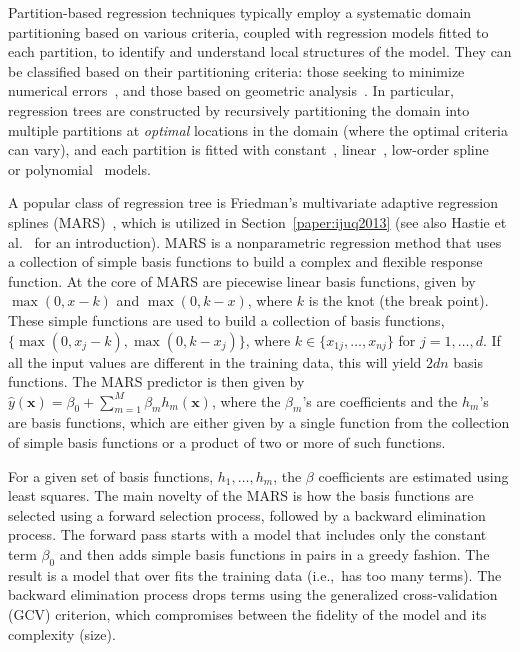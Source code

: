 Partition-based regression techniques typically employ a systematic domain partitioning based on various criteria, coupled with regression models fitted to each partition, to identify and understand local structures of the model.
%
They can be classified based on their partitioning criteria: those seeking to minimize numerical errors~\cite{Friedman1991,AlexanderGrimshaw1996,BreimanFriedmanOlshen1984a,ChaudhuriHuangLoh1994,ChipmanMcCulloch2010}, and those based on geometric analysis~\cite{GerberPotter2012,GerberRubelBremer2011,LiLueChen2000}.
%
In particular, regression trees are constructed by recursively partitioning the domain into multiple partitions at \emph{optimal} locations in the domain (where the optimal criteria can vary), and each partition is fitted with constant~\cite{BreimanFriedmanOlshen1984a}, linear~\cite{AlexanderGrimshaw1996,LiLueChen2000}, low-order spline~\cite{Friedman1991} or polynomial~\cite{ChaudhuriHuangLoh1994} models.

A popular class of regression tree is Friedman's multivariate adaptive regression splines (MARS)~\cite{Friedman1991}, which is utilized in Section~\ref{paper:ijuq2013} (see also Hastie et al.~\cite{HastieTibshiraniFriedman2008} for an introduction).
%
MARS is a nonparametric regression method that uses a collection of simple basis functions to build a complex and flexible response function.
%
At the core of MARS are piecewise linear basis functions, given by $\max(0, x - k)$ and $\max(0, k - x)$, where $k$ is the knot (the break point).
%
These simple functions are used to build a collection of basis functions, $\{\max(0, x_j-k), \max(0,k-x_j)\}$, where $k \in \{x_{1j}, \dots, x_{nj}\}$ for $j = 1, \dots, d$.
%
If all the input values are different in the training data, this will yield $2dn$ basis functions. The MARS predictor is then given by $\hat{y}(\mathbf{x}) = \beta_0 + \sum_{m=1}^M \beta_m h_m(\mathbf{x})$, where the $\beta_m$'s are coefficients and the $h_m$'s are basis functions, which are either given by a single function from the collection of simple basis functions or a product of
two or more of such functions.

For a given set of basis functions, $h_1, \dots, h_m$, the $\beta$ coefficients are estimated using least squares.
%
The main novelty of the MARS is how the basis functions are selected using a forward selection process, followed by a backward elimination process.
%
The forward pass starts with a model that includes only the constant term $\beta_0$ and then adds simple basis functions in pairs in a greedy fashion.
%
The result is a model that over fits the training data (i.e.,\ has too many terms).
%
The backward elimination process drops terms using the generalized cross-validation (GCV) criterion, which compromises between the fidelity of the model and its complexity (size).


